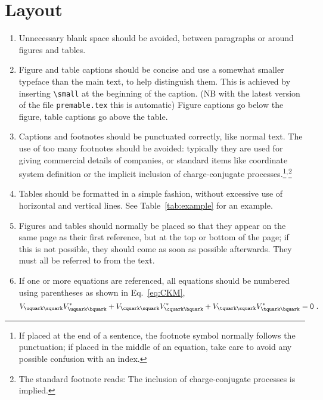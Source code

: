 \section{Layout}

\begin{enumerate}

\item Unnecessary blank space should be avoided, between paragraphs or
  around figures and tables.

\item Figure and table captions should be concise and use a somewhat smaller typeface
  than the main text, to help distinguish them. This is achieved by 
  inserting \verb!\small! at the beginning of the caption.
  (NB with the latest version of the file \verb!premable.tex! this is automatic)
  Figure captions go below the figure, table captions go above the
  table.

\item Captions and footnotes should be punctuated correctly, like
  normal text. The use of too many footnotes should be avoided:
  typically they are used for giving commercial details of companies,
  or standard items like coordinate system definition or the implicit
  inclusion of charge-conjugate processes.\footnote{If placed at the end
    of a sentence, the footnote symbol normally follows the
    punctuation; if placed in the middle of an equation, take care to
    avoid any possible confusion with an index.}$^,$\footnote{The standard footnote reads: The inclusion of charge-conjugate processes is implied.}

\item Tables should be formatted in a simple fashion, without
  excessive use of horizontal and vertical lines. See
  Table~\ref{tab:example} for an example.

\item Figures and tables should normally be placed so that they appear
  on the same page as their first reference, but at the top or bottom
  of the page; if this is not possible, they should come as soon as
  possible afterwards.  They must all be referred to from the text.

\item If one or more equations are referenced, all equations should be numbered using parentheses as shown in
  Eq.~\ref{eq:CKM},
  \begin{equation}
    \label{eq:CKM}
    V_{\uquark\squark}V_{\uquark\bquark}^* + 
    V_{\cquark\squark}V_{\cquark\bquark}^* + 
    V_{\tquark\squark}V_{\tquark\bquark}^* = 0 \ . 
  \end{equation}
  

\end{enumerate}
